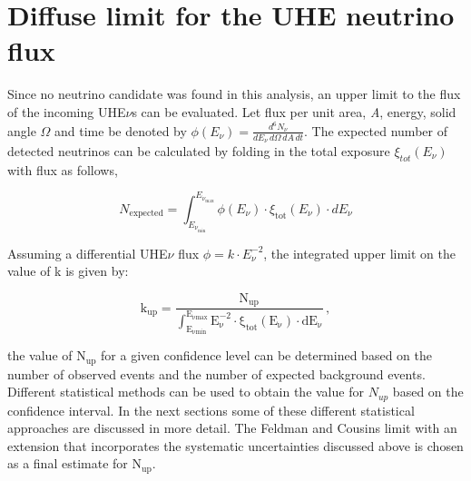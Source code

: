\section{Diffuse limit for the UHE neutrino flux}
\label{sec:diff_limit}
Since no neutrino candidate was found in this analysis, an upper limit to the flux of the incoming UHE$\nu$s can be evaluated. Let flux per unit area, \textit{A}, energy, solid angle $\Omega$ and time be denoted by $\phi(E_{\nu}) = \frac{d^6 N_{\nu}}{dE_{\nu}\,d\Omega\, dA \, dt}$. The expected number of detected neutrinos can be calculated by folding in the total exposure $\xi_{tot}(E_{\nu})$ with flux as follows,

\begin{equation}
  N_{\text{expected}} = \int_{E_{\nu_{\text{min}}}}^{E_{\nu_{\text{max}}}} \phi(E_{\nu}) \cdot \xi_{\text{tot}}(E_{\nu}) \cdot dE_{\nu}
\end{equation}

Assuming a differential UHE$\nu$ flux $\phi = k \cdot E_{\nu}^{-2}$, the integrated upper limit on the value of k is given by:

\begin{equation}
  \label{eq:integ_lim}
  \mathrm{k_{up} = \frac{N_{up}}{\int_{E_{\nu min}}^{E_{\nu max}} E_{\nu}^{-2} \cdot \xi_{tot}(E_{\nu}) \cdot dE_{\nu}}} \, ,
\end{equation}

the value of $\mathrm{N_{up}}$ for a given confidence level can be determined based on the number of observed events and the number of expected background events. Different statistical methods can be used to obtain the value for $N_{up}$ based on the confidence interval. In the next sections some of these different statistical approaches are discussed in more detail. The Feldman and Cousins limit with an extension that incorporates the systematic uncertainties discussed above is chosen as a final estimate for $\mathrm{N_{up}}$.

